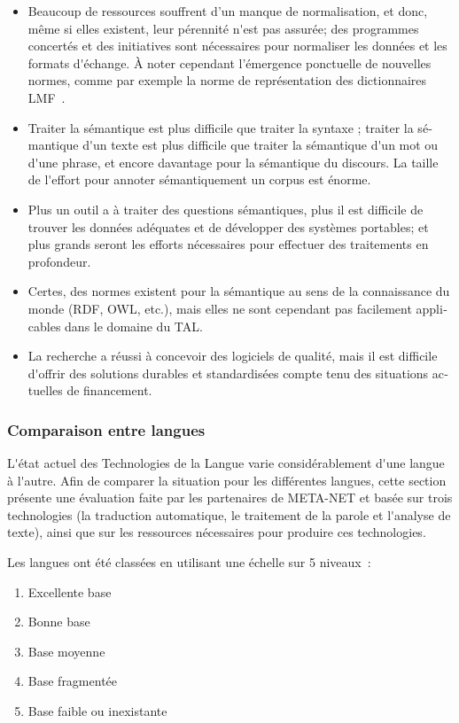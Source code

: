 \begin{french}
\begin{multicols}{2}
\begin{itemize}
\item Beaucoup de ressources souffrent d'un manque de normalisation,
  et donc, même si elles existent, leur pérennité n{\mbox '}est pas
  assurée; des programmes concertés et des initiatives sont
  nécessaires pour normaliser les données et les formats d{\mbox
    '}échange. À noter cependant l'émergence ponctuelle de nouvelles
  normes, comme par exemple la norme de représentation des dictionnaires LMF~\cite{LMF}.

\item Traiter la sémantique est plus difficile que traiter la syntaxe ;
traiter la sémantique d{\mbox '}un texte est plus difficile que traiter la
sémantique d{\mbox '}un mot ou d{\mbox '}une phrase, et encore davantage pour la sémantique
du discours. La taille de l{\mbox '}effort pour annoter sémantiquement un
corpus est énorme.

\item Plus un outil a à traiter des questions sémantiques, plus il est
difficile de trouver les données adéquates et de développer des
systèmes portables; et plus grands seront les efforts nécessaires pour
effectuer des traitements en profondeur.

\item Certes, des normes existent pour la sémantique au sens de la
connaissance du monde (RDF, OWL, etc.), mais elles ne sont cependant
pas facilement applicables dans le domaine du TAL.

\item La recherche a réussi à concevoir des logiciels de qualité, mais il
est difficile d{\mbox '}offrir des solutions durables et standardisées compte
tenu des situations actuelles de financement.
\end{itemize}

\subsubsection{Comparaison entre langues}

L{\mbox '}état actuel des Technologies de la Langue varie considérablement
d{\mbox '}une langue à l{\mbox '}autre. Afin de comparer la situation pour les
différentes langues, cette section présente une évaluation faite par
les partenaires de META-NET et basée sur trois technologies (la
traduction automatique, le traitement de la parole et l{\mbox '}analyse de
texte), ainsi que sur les ressources nécessaires pour produire ces
technologies.

Les langues ont été classées en utilisant une échelle sur 5 niveaux~:
\begin{enumerate}
\item Excellente base
\item Bonne base
\item Base moyenne
\item Base fragmentée
\item Base faible ou inexistante
\end{enumerate}


\end{multicols}
\end{french}
